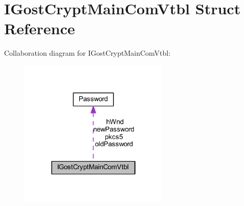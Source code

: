 \hypertarget{struct_i_gost_crypt_main_com_vtbl}{}\section{I\+Gost\+Crypt\+Main\+Com\+Vtbl Struct Reference}
\label{struct_i_gost_crypt_main_com_vtbl}


Collaboration diagram for I\+Gost\+Crypt\+Main\+Com\+Vtbl\+:
\nopagebreak
\begin{figure}[H]
\begin{center}
\leavevmode
\includegraphics[width=202pt]{struct_i_gost_crypt_main_com_vtbl__coll__graph}
\end{center}
\end{figure}

